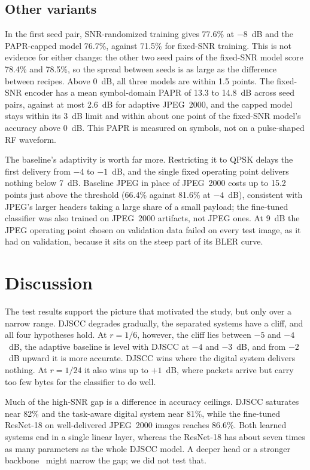 \documentclass[conference]{IEEEtran}
\begin{document}
\subsection{Other variants}
In the first seed pair, SNR-randomized training gives 77.6\% at $-8$~dB and the PAPR-capped model 76.7\%, against 71.5\% for fixed-SNR training. This is not evidence for either change: the other two seed pairs of the fixed-SNR model score 78.4\% and 78.5\%, so the spread between seeds is as large as the difference between recipes. Above 0~dB, all three models are within 1.5 points. The fixed-SNR encoder has a mean symbol-domain PAPR of 13.3 to 14.8~dB across seed pairs, against at most 2.6~dB for adaptive JPEG~2000, and the capped model stays within its 3~dB limit and within about one point of the fixed-SNR model's accuracy above 0~dB. This PAPR is measured on symbols, not on a pulse-shaped RF waveform.

The baseline's adaptivity is worth far more. Restricting it to QPSK delays the first delivery from $-4$ to $-1$~dB, and the single fixed operating point delivers nothing below 7~dB. Baseline JPEG in place of JPEG~2000 costs up to 15.2 points just above the threshold (66.4\% against 81.6\% at $-4$~dB), consistent with JPEG's larger headers taking a large share of a small payload; the fine-tuned classifier was also trained on JPEG~2000 artifacts, not JPEG ones. At 9~dB the JPEG operating point chosen on validation data failed on every test image, as it had on validation, because it sits on the steep part of its BLER curve.

\section{Discussion}
The test results support the picture that motivated the study, but only over a narrow range. DJSCC degrades gradually, the separated systems have a cliff, and all four hypotheses hold. At $r=1/6$, however, the cliff lies between $-5$ and $-4$~dB, the adaptive baseline is level with DJSCC at $-4$ and $-3$~dB, and from $-2$~dB upward it is more accurate. DJSCC wins where the digital system delivers nothing. At $r=1/24$ it also wins up to $+1$~dB, where packets arrive but carry too few bytes for the classifier to do well.

Much of the high-SNR gap is a difference in accuracy ceilings. DJSCC saturates near 82\% and the task-aware digital system near 81\%, while the fine-tuned ResNet-18 on well-delivered JPEG~2000 images reaches 86.6\%. Both learned systems end in a single linear layer, whereas the ResNet-18 has about seven times as many parameters as the whole DJSCC model. A deeper head or a stronger backbone~\cite{yang2023witt} might narrow the gap; we did not test that.
\end{document}
